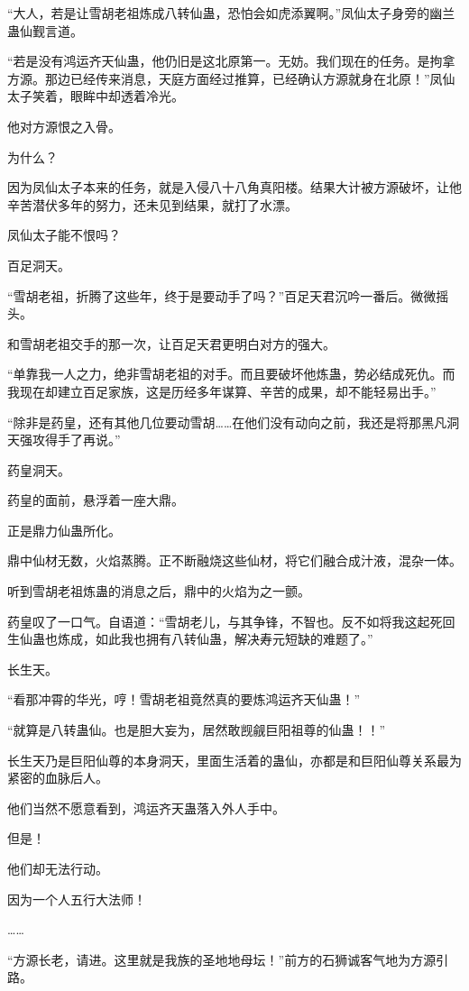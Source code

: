 \begin{this_body}
“大人，若是让雪胡老祖炼成八转仙蛊，恐怕会如虎添翼啊。”凤仙太子身旁的幽兰蛊仙觐言道。

“若是没有鸿运齐天仙蛊，他仍旧是这北原第一。无妨。我们现在的任务。是拘拿方源。那边已经传来消息，天庭方面经过推算，已经确认方源就身在北原！”凤仙太子笑着，眼眸中却透着冷光。

他对方源恨之入骨。

为什么？

因为凤仙太子本来的任务，就是入侵八十八角真阳楼。结果大计被方源破坏，让他辛苦潜伏多年的努力，还未见到结果，就打了水漂。

凤仙太子能不恨吗？

百足洞天。

“雪胡老祖，折腾了这些年，终于是要动手了吗？”百足天君沉吟一番后。微微摇头。

和雪胡老祖交手的那一次，让百足天君更明白对方的强大。

“单靠我一人之力，绝非雪胡老祖的对手。而且要破坏他炼蛊，势必结成死仇。而我现在却建立百足家族，这是历经多年谋算、辛苦的成果，却不能轻易出手。”

“除非是药皇，还有其他几位要动雪胡……在他们没有动向之前，我还是将那黑凡洞天强攻得手了再说。”

药皇洞天。

药皇的面前，悬浮着一座大鼎。

正是鼎力仙蛊所化。

鼎中仙材无数，火焰蒸腾。正不断融烧这些仙材，将它们融合成汁液，混杂一体。

听到雪胡老祖炼蛊的消息之后，鼎中的火焰为之一颤。

药皇叹了一口气。自语道：“雪胡老儿，与其争锋，不智也。反不如将我这起死回生仙蛊也炼成，如此我也拥有八转仙蛊，解决寿元短缺的难题了。”

长生天。

“看那冲霄的华光，哼！雪胡老祖竟然真的要炼鸿运齐天仙蛊！”

“就算是八转蛊仙。也是胆大妄为，居然敢觊觎巨阳祖尊的仙蛊！！”

长生天乃是巨阳仙尊的本身洞天，里面生活着的蛊仙，亦都是和巨阳仙尊关系最为紧密的血脉后人。

他们当然不愿意看到，鸿运齐天蛊落入外人手中。

但是！

他们却无法行动。

因为一个人五行大法师！

……

“方源长老，请进。这里就是我族的圣地地母坛！”前方的石狮诚客气地为方源引路。


\end{this_body}
